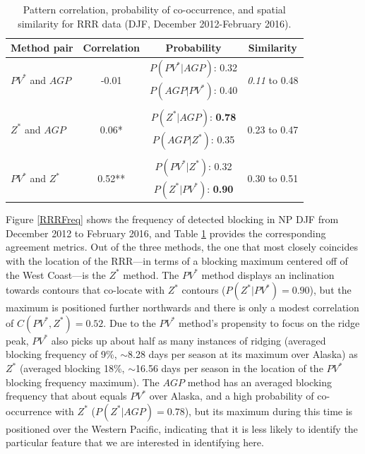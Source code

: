 \documentclass[smallextended]{svjour3}       %
\numberwithin{equation}{section}
\begin{document}
\begin{table}
\caption{Pattern correlation, probability of co-occurrence, and spatial similarity for RRR data (DJF, December 2012-February 2016). }\label{RRRtable}
\centering
\begin{tabular}{|l|ccc|}
\hline
Method pair & Correlation & Probability & Similarity \\
\hline
\multirow{2}{*}{$PV^*$ and $AGP$} & \multirow{2}{*}{-0.01} & $P(PV^*|AGP)$: 0.32 & \multirow{2}{*}{\textit{0.11} to 0.48} \\
& & $P(AGP | PV^*)$: {0.40 }& \\
& & & \\
\multirow{2}{*}{$Z^*$ and $AGP$} & \multirow{2}{*}{0.06*} & $P(Z^*|AGP)$: \textbf{0.78} & \multirow{2}{*}{0.23 to 0.47} \\
& & $P(AGP | Z^*)$: {0.35} & \\
& & & \\
\multirow{2}{*}{$PV^*$ and $Z^*$} & \multirow{2}{*}{0.52**} & $P(PV^*|Z^*)$: 0.32 & \multirow{2}{*}{0.30 to 0.51} \\
& & $P(Z^* | PV^*)$: \textbf{0.90} &  \\
\hline
\end{tabular}
\end{table}



Figure \ref{RRRFreq} shows the frequency of detected blocking in NP DJF from December 2012 to February 2016, and Table \ref{RRRtable} provides the corresponding agreement metrics. Out of the three methods, the one that most closely coincides with the location of the RRR---in terms of a blocking maximum centered off of the West Coast---is the $Z^*$ method. The $PV^*$ method displays an inclination towards contours that co-locate with $Z^*$ contours ($P(Z^*|PV^*)=0.90$), but the maximum is positioned further northwards and there is only a modest correlation of $C(PV^*, Z^*)=0.52$. Due to the $PV^*$ method's propensity to focus on the ridge peak, $PV^*$ also picks up about half as many instances of ridging (averaged blocking frequency of 9\%, $\sim$8.28 days per season at its maximum over Alaska) as $Z^*$ (averaged blocking 18\%, $\sim$16.56 days per season in the location of the $PV^*$ blocking frequency maximum). The $AGP$ method has an averaged blocking frequency that about equals $PV^*$ over Alaska, and a high probability of co-occurrence with $Z^*$ ($P(Z^*|AGP)=0.78$), but its maximum during this time is positioned over the Western Pacific, indicating that it is less likely to identify the particular feature that we are interested in identifying here. 
\end{document}
